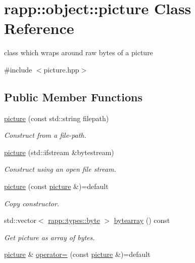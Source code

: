\hypertarget{classrapp_1_1object_1_1picture}{\section{rapp\-:\-:object\-:\-:picture Class Reference}
\label{classrapp_1_1object_1_1picture}
}


class which wraps around raw bytes of a picture  




{\ttfamily \#include $<$picture.\-hpp$>$}

\subsection*{Public Member Functions}
\begin{DoxyCompactItemize}
\item 
\hyperlink{classrapp_1_1object_1_1picture_a037d64b0a69603a9ad624760cf2b1072}{picture} (const std\-::string filepath)
\begin{DoxyCompactList}\small\item\em Construct from a file-\/path. \end{DoxyCompactList}\item 
\hyperlink{classrapp_1_1object_1_1picture_a20da2075d7f03172258584b2ad8f2fb3}{picture} (std\-::ifstream \&bytestream)
\begin{DoxyCompactList}\small\item\em Construct using an open file stream. \end{DoxyCompactList}\item 
\hyperlink{classrapp_1_1object_1_1picture_a9e0aa9a62b6455d542eb14705d2be6fe}{picture} (const \hyperlink{classrapp_1_1object_1_1picture}{picture} \&)=default
\begin{DoxyCompactList}\small\item\em Copy constructor. \end{DoxyCompactList}\item 
std\-::vector$<$ \hyperlink{namespacerapp_1_1types_a1dbc9dc2ab4507d8fb58ac3a204d307b}{rapp\-::types\-::byte} $>$ \hyperlink{classrapp_1_1object_1_1picture_a27bd4bd6bb318e2a1866c3aa7c4d66a5}{bytearray} () const 
\begin{DoxyCompactList}\small\item\em Get picture as array of bytes. \end{DoxyCompactList}\item 
\hyperlink{classrapp_1_1object_1_1picture}{picture} \& \hyperlink{classrapp_1_1object_1_1picture_a312b1e70d3e4af4f4a8ce8fc98b19afa}{operator=} (const \hyperlink{classrapp_1_1object_1_1picture}{picture} \&)=default

\end{DoxyCompactItemize}
